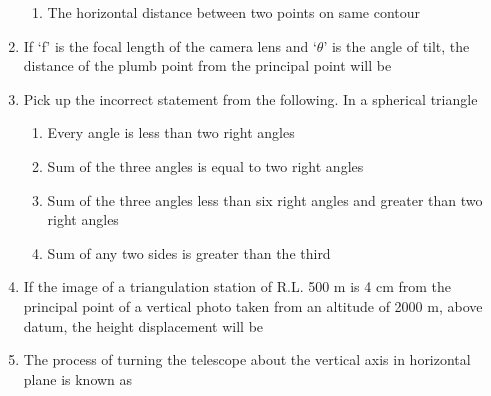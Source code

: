 \documentclass[11pt,a4paper]{article}
\begin{document}
\begin{enumerate}
\begin{enumerate}[label=\Alph*.]
\item{The horizontal distance between two points on same contour}
\end{enumerate}
\item{If `f' is the focal length of the camera lens and `$\theta$' is the angle of tilt, the distance of the plumb point from the principal point will be
}
\\
\item{Pick up the incorrect statement from the following. In a spherical triangle}
\begin{enumerate}[label=\Alph*.]
\item{Every angle is less than two right angles}
\item{Sum of the three angles is equal to two right angles}
\item{Sum of the three angles less than six right angles and greater than two right angles}
\item{Sum of any two sides is greater than the third}
\end{enumerate}
\item{If the image of a triangulation station of R.L. 500 m is 4 cm from the principal point of a vertical photo taken from an altitude of 2000 m, above datum, the height displacement will be}
\\\begin{enumerate*}[itemjoin=\qquad, label=\Alph*.]
\item{2 mm}
\item{4 mm}
\item{6 mm}
\item{10 mm}
\end{enumerate*}
\item{The process of turning the telescope about the vertical axis in horizontal plane is known as}
\\

\end{enumerate}
\end{document}
